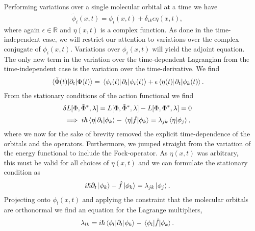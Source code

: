     Performing variations over a single molecular orbital at a time we have
    \begin{align}
        \tilde{\phi}_i(x, t)
        = \phi_i(x, t) + \delta_{ik}\epsilon\eta(x, t),
    \end{align}
    where again $\epsilon \in \mathbb{R}$ and $\eta(x, t)$ is a complex
    function.
    As done in the time-independent case, we will restrict our attention to
    variations over the complex conjugate of $\phi_i(x, t)$.
    Variations over $\phi_i(x, t)$ will yield the adjoint equation.
    The only new term in the variation over the time-dependent Lagrangian from
    the time-independent case is the variation over the time-derivative.
    We find
    \begin{align}
        \mel*{\tilde{\Phi}(t)}{\partial_t}{\Phi(t)}
        = \mel*{\phi_i(t)}{\partial_t}{\phi_i(t)}
        + \epsilon\mel*{\eta(t)}{\partial_t}{\phi_k(t)}.
    \end{align}
    From the stationary conditions of the action functional we find
    \begin{gather}
        \delta L[\Phi, \tilde{\Phi}^{*}, \lambda]
        = L[\Phi, \tilde{\Phi}^{*}, \lambda]
        - L[\Phi, \Phi^{*}, \lambda]
        = 0 \\
        \implies
        i\hslash\mel*{\eta}{\partial_t}{\phi_k}
        -\mel*{\eta}{\hat{f}}{\phi_k}
        = \lambda_{jk}\braket*{\eta}{\phi_j},
    \end{gather}
    where we now for the sake of brevity removed the explicit time-dependence of
    the orbitals and the operators.
    Furthermore, we jumped straight from the variation of the energy functional
    to include the Fock-operator.
    As $\eta(x, t)$ was arbitrary, this must be valid for all choices of
    $\eta(x, t)$ and we can formulate the stationary condition as
    \begin{align}
        i\hslash\partial_t\ket*{\phi_k}
        - \hat{f}\ket*{\phi_k}
        = \lambda_{jk}\ket*{\phi_j}.
        \label{eq:stationary-condition-1}
    \end{align}
    Projecting onto $\phi_l(x, t)$ and applying the constraint that the
    molecular orbitals are orthonormal we find an equation for the Lagrange
    multipliers,
    \begin{align}
        \lambda_{lk}
        = i\hslash\mel*{\phi_l}{\partial_t}{\phi_k}
        - \mel*{\phi_l}{\hat{f}}{\phi_k}.
    \end{align}
